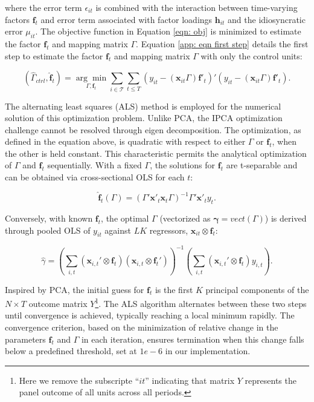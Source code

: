 \documentclass[12pt]{article}
\begin{document}
where the error term $\epsilon_{it}$ is combined with the interaction between time-varying factors $\bm{f}_t$ and error term associated with factor loadings $\bm{h}_{it}$ and the idiosyncratic error $\mu_{it}$. The objective function in Equation \ref{eqn: obj} is minimized to estimate the factor $\bm{f}_t$ and mapping matrix $\Gamma$. Equation \ref{app: eqn first step} details the first step to estimate the factor $\bm{f}_t$ and mapping matrix $\Gamma$ with only the control units:

\begin{equation}
\label{app: eqn first step}
(\hat{\Gamma}_{ctrl}, \hat{\bm{f}}_t) = \underset{\Gamma, \bm{f}_t}{\arg\min} \sum_{i \in \mathcal{T}} \sum_{t \leq T} \left( y_{it} - (\bm{x}_{it}\Gamma) \bm{f}'_{t} \right)' \left( y_{it} - (\bm{x}_{it}\Gamma) \bm{f}'_{t} \right).
\end{equation}

The alternating least squares (ALS) method is employed for the numerical solution of this optimization problem. Unlike PCA, the IPCA optimization challenge cannot be resolved through eigen decomposition. The optimization, as defined in the equation above, is quadratic with respect to either $\Gamma$ or $\bm{f}_t$, when the other is held constant. This characteristic permits the analytical optimization of $\Gamma$ and $\bm{f}_t$ sequentially. With a fixed $\Gamma$, the solutions for $\bm{f}_t$ are t-separable and can be obtained via cross-sectional OLS for each $t$:

\begin{equation}
\label{app: eqn update f}
\hat{\bm{f}}_t(\Gamma) = (\Gamma' \bm{x}'_t \bm{x}_t \Gamma)^{-1} \Gamma' \bm{x}'_t y_t.
\end{equation}

Conversely, with known $\bm{f}_{t}$, the optimal $\Gamma$ (vectorized as $\bm{\gamma} = vect(\Gamma)$) is derived through pooled OLS of $y_{it}$ against $LK$ regressors, $\bm{x}_{it} \otimes \bm{f}_t$:

\begin{equation}
\label{app: eqn update gamma}
\hat{\gamma} = \left( \sum_{i,t} (\bm{x}_{i,t}' \otimes \bm{f}_t) (\bm{x}_{i,t} \otimes \bm{f}_t') \right)^{-1} \left( \sum_{i,t} (\bm{x}_{i,t}' \otimes \bm{f}_t) y_{i,t} \right).
\end{equation}

Inspired by PCA, the initial guess for $\bm{f}_t$ is the first $K$ principal components of the $N \times T$ outcome matrix $Y$\footnote{Here we remove the subscripte ``$it$'' indicating that matrix $Y$ represents the panel outcome of all units across all periods.}. The ALS algorithm alternates between these two steps until convergence is achieved, typically reaching a local minimum rapidly. The convergence criterion, based on the minimization of relative change in the parameters $\bm{f}_t$ and $\Gamma$ in each iteration, ensures termination when this change falls below a predefined threshold, set at $1e-6$ in our implementation.
\end{document}
